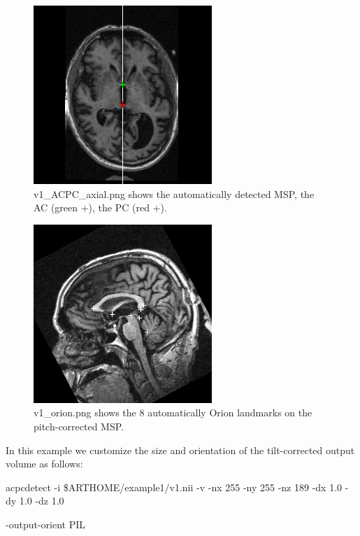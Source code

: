 \documentclass[11pt]{article}
\begin{document}
\begin{figure}
\begin{center}
\includegraphics[scale=1.0]{v1_ACPC_axial.png}
\caption{v1\_ACPC\_axial.png shows the automatically detected MSP, the AC (green +), the PC (red +).
}
\label{fig:axial}
\end{center}
\end{figure}

\begin{figure}
\begin{center}
\includegraphics[scale=1.0]{v1_orion.png}
\caption{v1\_orion.png shows the 8 automatically Orion landmarks on the pitch-corrected MSP.
}
\label{fig:orion}
\end{center}
\end{figure}

 In this example we customize the size and orientation of
the tilt-corrected output volume as follows:

acpcdetect -i \$ARTHOME/example1/v1.nii -v -nx 255 -ny 255 -nz 189 -dx 1.0 -dy 1.0 -dz 1.0 

-output-orient PIL

\end{document}
